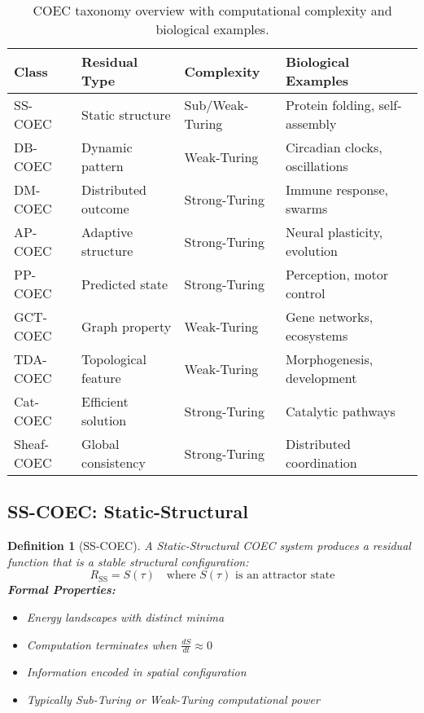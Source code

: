 \documentclass[11pt]{article}
\newtheorem{definition}{Definition}
\begin{document}
\begin{table}[h]
\centering
\small
\begin{tabular}{|l|l|l|p{5cm}|}
\hline
\textbf{Class} & \textbf{Residual Type} & \textbf{Complexity} & \textbf{Biological Examples} \\
\hline
SS-COEC & Static structure & Sub/Weak-Turing & Protein folding, self-assembly \\
DB-COEC & Dynamic pattern & Weak-Turing & Circadian clocks, oscillations \\
DM-COEC & Distributed outcome & Strong-Turing & Immune response, swarms \\
AP-COEC & Adaptive structure & Strong-Turing & Neural plasticity, evolution \\
PP-COEC & Predicted state & Strong-Turing & Perception, motor control \\
GCT-COEC & Graph property & Weak-Turing & Gene networks, ecosystems \\
TDA-COEC & Topological feature & Weak-Turing & Morphogenesis, development \\
Cat-COEC & Efficient solution & Strong-Turing & Catalytic pathways \\
Sheaf-COEC & Global consistency & Strong-Turing & Distributed coordination \\
\hline
\end{tabular}
\caption{COEC taxonomy overview with computational complexity and biological examples.}
\label{tab:taxonomy}
\end{table}

\subsection{SS-COEC: Static-Structural}

\begin{definition}[SS-COEC]
A Static-Structural COEC system produces a residual function that is a stable structural configuration:
\begin{equation}
R_{\text{SS}} = S(\tau) \quad \text{where } S(\tau) \text{ is an attractor state}
\end{equation}
\textbf{Formal Properties:}
\begin{itemize}
\item Energy landscapes with distinct minima
\item Computation terminates when $\frac{dS}{dt} \approx 0$
\item Information encoded in spatial configuration
\item Typically Sub-Turing or Weak-Turing computational power
\end{itemize}
\end{definition}
\end{document}
